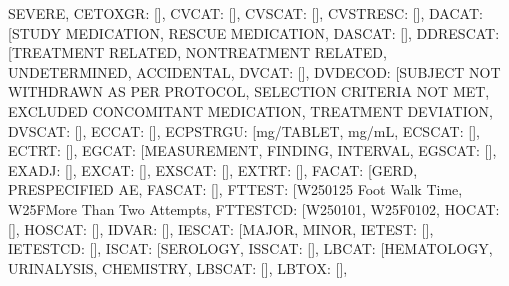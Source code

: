 \documentclass[letterpaper,10pt,english]{sphinxmanual}
\begin{document}
\begin{fulllineitems}
\begin{fulllineitems}
\textquotesingle{}SEVERE\textquotesingle{}{]}, \textquotesingle{}CETOXGR\textquotesingle{}: {[}{]}, \textquotesingle{}CVCAT\textquotesingle{}: {[}{]}, \textquotesingle{}CVSCAT\textquotesingle{}: {[}{]}, \textquotesingle{}CVSTRESC\textquotesingle{}: {[}{]}, \textquotesingle{}DACAT\textquotesingle{}: {[}\textquotesingle{}STUDY MEDICATION\textquotesingle{}, \textquotesingle{}RESCUE MEDICATION\textquotesingle{}{]}, \textquotesingle{}DASCAT\textquotesingle{}: {[}{]}, \textquotesingle{}DDRESCAT\textquotesingle{}: {[}\textquotesingle{}TREATMENT RELATED\textquotesingle{}, \textquotesingle{}NONTREATMENT RELATED\textquotesingle{}, \textquotesingle{}UNDETERMINED\textquotesingle{}, \textquotesingle{}ACCIDENTAL\textquotesingle{}{]}, \textquotesingle{}DVCAT\textquotesingle{}: {[}{]}, \textquotesingle{}DVDECOD\textquotesingle{}: {[}\textquotesingle{}SUBJECT NOT WITHDRAWN AS PER PROTOCOL\textquotesingle{}, \textquotesingle{}SELECTION CRITERIA NOT MET\textquotesingle{}, \textquotesingle{}EXCLUDED CONCOMITANT MEDICATION\textquotesingle{}, \textquotesingle{}TREATMENT DEVIATION\textquotesingle{}{]}, \textquotesingle{}DVSCAT\textquotesingle{}: {[}{]}, \textquotesingle{}ECCAT\textquotesingle{}: {[}{]}, \textquotesingle{}ECPSTRGU\textquotesingle{}: {[}\textquotesingle{}mg/TABLET\textquotesingle{}, \textquotesingle{}mg/mL\textquotesingle{}{]}, \textquotesingle{}ECSCAT\textquotesingle{}: {[}{]}, \textquotesingle{}ECTRT\textquotesingle{}: {[}{]}, \textquotesingle{}EGCAT\textquotesingle{}: {[}\textquotesingle{}MEASUREMENT\textquotesingle{}, \textquotesingle{}FINDING\textquotesingle{}, \textquotesingle{}INTERVAL\textquotesingle{}{]}, \textquotesingle{}EGSCAT\textquotesingle{}: {[}{]}, \textquotesingle{}EXADJ\textquotesingle{}: {[}{]}, \textquotesingle{}EXCAT\textquotesingle{}: {[}{]}, \textquotesingle{}EXSCAT\textquotesingle{}: {[}{]}, \textquotesingle{}EXTRT\textquotesingle{}: {[}{]}, \textquotesingle{}FACAT\textquotesingle{}: {[}\textquotesingle{}GERD\textquotesingle{}, \textquotesingle{}PRE\sphinxhyphen{}SPECIFIED AE\textquotesingle{}{]}, \textquotesingle{}FASCAT\textquotesingle{}: {[}{]}, \textquotesingle{}FTTEST\textquotesingle{}: {[}\textquotesingle{}W2501\sphinxhyphen{}25 Foot Walk Time\textquotesingle{}, \textquotesingle{}W25F\sphinxhyphen{}More Than Two Attempts\textquotesingle{}{]}, \textquotesingle{}FTTESTCD\textquotesingle{}: {[}\textquotesingle{}W250101\textquotesingle{}, \textquotesingle{}W25F0102\textquotesingle{}{]}, \textquotesingle{}HOCAT\textquotesingle{}: {[}{]}, \textquotesingle{}HOSCAT\textquotesingle{}: {[}{]}, \textquotesingle{}IDVAR\textquotesingle{}: {[}{]}, \textquotesingle{}IESCAT\textquotesingle{}: {[}\textquotesingle{}MAJOR\textquotesingle{}, \textquotesingle{}MINOR\textquotesingle{}{]}, \textquotesingle{}IETEST\textquotesingle{}: {[}{]}, \textquotesingle{}IETESTCD\textquotesingle{}: {[}{]}, \textquotesingle{}ISCAT\textquotesingle{}: {[}\textquotesingle{}SEROLOGY\textquotesingle{}{]}, \textquotesingle{}ISSCAT\textquotesingle{}: {[}{]}, \textquotesingle{}LBCAT\textquotesingle{}: {[}\textquotesingle{}HEMATOLOGY\textquotesingle{}, \textquotesingle{}URINALYSIS\textquotesingle{}, \textquotesingle{}CHEMISTRY\textquotesingle{}{]}, \textquotesingle{}LBSCAT\textquotesingle{}: {[}{]}, \textquotesingle{}LBTOX\textquotesingle{}: {[}{]}, 
\end{fulllineitems}
\end{fulllineitems}
\end{document}

